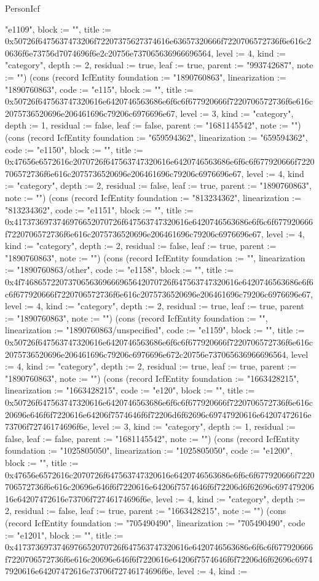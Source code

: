 \begin{lexlean}{PersonIcf}
\begin{semanticmodule}
{"e1109", block := "", title := 0x50726f6475637473206f72207375627374616e63657320666f7220706572736f6e616c20636f6e73756d7074696f6e2c20756e737065636966696564, level := 4, kind := "category", depth := 2, residual := true, leaf := true, parent := "993742687", note := ""}) (cons (record IcfEntity {foundation := "1890760863", linearization := "1890760863", code := "e115", block := "", title := 0x50726f647563747320616e6420746563686e6f6c6f677920666f7220706572736f6e616c2075736520696e206461696c79206c6976696e67, level := 3, kind := "category", depth := 1, residual := false, leaf := false, parent := "1681145542", note := ""}) (cons (record IcfEntity {foundation := "659594362", linearization := "659594362", code := "e1150", block := "", title := 0x47656e6572616c2070726f647563747320616e6420746563686e6f6c6f677920666f7220706572736f6e616c2075736520696e206461696c79206c6976696e67, level := 4, kind := "category", depth := 2, residual := false, leaf := true, parent := "1890760863", note := ""}) (cons (record IcfEntity {foundation := "813234362", linearization := "813234362", code := "e1151", block := "", title := 0x4173736973746976652070726f647563747320616e6420746563686e6f6c6f677920666f7220706572736f6e616c2075736520696e206461696c79206c6976696e67, level := 4, kind := "category", depth := 2, residual := false, leaf := true, parent := "1890760863", note := ""}) (cons (record IcfEntity {foundation := "", linearization := "1890760863/other", code := "e1158", block := "", title := 0x4f74686572207370656369666965642070726f647563747320616e6420746563686e6f6c6f677920666f7220706572736f6e616c2075736520696e206461696c79206c6976696e67, level := 4, kind := "category", depth := 2, residual := true, leaf := true, parent := "1890760863", note := ""}) (cons (record IcfEntity {foundation := "", linearization := "1890760863/unspecified", code := "e1159", block := "", title := 0x50726f647563747320616e6420746563686e6f6c6f677920666f7220706572736f6e616c2075736520696e206461696c79206c6976696e672c20756e737065636966696564, level := 4, kind := "category", depth := 2, residual := true, leaf := true, parent := "1890760863", note := ""}) (cons (record IcfEntity {foundation := "1663428215", linearization := "1663428215", code := "e120", block := "", title := 0x50726f647563747320616e6420746563686e6f6c6f677920666f7220706572736f6e616c20696e646f6f7220616e64206f7574646f6f72206d6f62696c69747920616e64207472616e73706f72746174696f6e, level := 3, kind := "category", depth := 1, residual := false, leaf := false, parent := "1681145542", note := ""}) (cons (record IcfEntity {foundation := "1025805050", linearization := "1025805050", code := "e1200", block := "", title := 0x47656e6572616c2070726f647563747320616e6420746563686e6f6c6f677920666f7220706572736f6e616c20696e646f6f7220616e64206f7574646f6f72206d6f62696c69747920616e64207472616e73706f72746174696f6e, level := 4, kind := "category", depth := 2, residual := false, leaf := true, parent := "1663428215", note := ""}) (cons (record IcfEntity {foundation := "705490490", linearization := "705490490", code := "e1201", block := "", title := 0x4173736973746976652070726f647563747320616e6420746563686e6f6c6f677920666f7220706572736f6e616c20696e646f6f7220616e64206f7574646f6f72206d6f62696c69747920616e64207472616e73706f72746174696f6e, level := 4, kind := }
\end{semanticmodule}
\end{lexlean}

